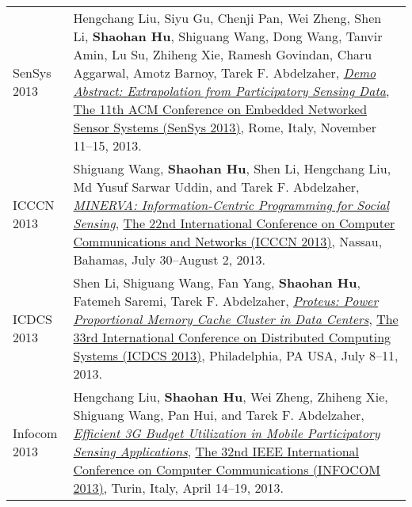 \begin{longtabu}{p{.51\sectionwidth} p{.78\resumewidth}}
{\sc SenSys 2013}\hypertarget{liu2013sensys}{} &
Hengchang Liu, Siyu Gu, Chenji Pan, Wei Zheng, Shen Li, \textbf{Shaohan Hu}, Shiguang Wang, Dong Wang, Tanvir Amin, Lu Su, Zhiheng Xie, Ramesh Govindan, Charu Aggarwal, Amotz Barnoy, Tarek F. Abdelzaher,
\href{http://portal.acm.org/citation.cfm?id=2517431}{\emph{Demo Abstract: Extrapolation from Participatory Sensing Data}},
\href{http://sensys.acm.org/2013/}{\textsf{The 11th ACM Conference on Embedded Networked Sensor Systems (SenSys 2013)}},
Rome, Italy, November 11--15, 2013. \\


{\sc ICCCN 2013}\hypertarget{wang2013icccn}{} &
Shiguang Wang, \textbf{Shaohan Hu}, Shen Li, Hengchang Liu, Md Yusuf Sarwar Uddin, and Tarek F. Abdelzaher,
\href{http://ieeexplore.ieee.org/document/6614152}{\emph{MINERVA: Information-Centric Programming for Social Sensing}},
\href{http://www.icccn.org/icccn13/}{\textsf{The 22nd International Conference on Computer Communications and Networks (ICCCN 2013)}},
Nassau, Bahamas, July 30--August 2, 2013. \\

{\sc ICDCS 2013}\hypertarget{li2013icdcs}{} &
Shen Li, Shiguang Wang, Fan Yang, \textbf{Shaohan Hu}, Fatemeh Saremi, Tarek F. Abdelzaher,
\href{http://ieeexplore.ieee.org/document/6681577}{\emph{Proteus: Power Proportional Memory Cache Cluster in Data Centers}},
\href{http://www.temple.edu/cis/icdcs2013/}{\textsf{The 33rd International Conference on Distributed Computing Systems (ICDCS 2013)}},
Philadelphia, PA USA, July 8--11, 2013. \\


{\sc Infocom 2013}\hypertarget{liu2013infocom}{} &
Hengchang Liu, \textbf{Shaohan Hu}, Wei Zheng, Zhiheng Xie, Shiguang Wang, Pan Hui, and Tarek F. Abdelzaher,
\href{http://ieeexplore.ieee.org/document/6566935}{\emph{Efficient 3G Budget Utilization in Mobile Participatory Sensing Applications}},
\href{http://infocom2013.ieee-infocom.org/}{\textsf{The 32nd IEEE International Conference on Computer Communications (INFOCOM 2013)}},
Turin, Italy, April 14--19, 2013. \\


\end{longtabu}
